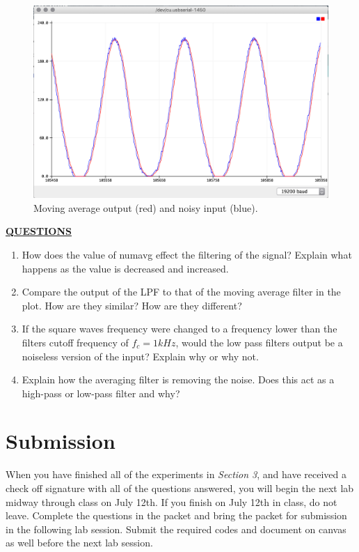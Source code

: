 \documentclass[12pt]{article}
\begin{document}
\begin{figure}[H]
    \centering
    \includegraphics[width=15cm]{photos/lab/movingaverage.png}
    \caption{Moving average output (red) and noisy input (blue).}
\end{figure}
\newpage
\textbf{\underline{QUESTIONS}}
\begin{enumerate}
    \item How does the value of numavg effect the filtering of the signal? Explain what happens as the value is decreased and increased.
        \fillwithlines{1in}

    \item Compare the output of the LPF to that of the moving average filter in the plot. How are they similar? How are they different?
        \fillwithlines{1in}
        
    \item If the square waves frequency were changed to a frequency lower than the filters cutoff frequency of $f_{c} = 1kHz$, would the low pass filters output be a noiseless version of the input? Explain why or why not.
        \fillwithlines{1in}
        
    \item Explain how the averaging filter is removing the noise. Does this act as a high-pass or low-pass filter and why? 
        \fillwithlines{1in}
\end{enumerate}  

\checkoffsubsub

\section{Submission}

When you have finished all of the experiments in \textit{Section 3}, and have received a check off signature with all of the questions answered, you will begin the next lab midway through class on July 12th. If you finish on July 12th in class, do not leave. Complete the questions in the packet and bring the packet for submission in the following lab session. Submit the required codes  and document on canvas as well before the next lab session.
\end{document}
